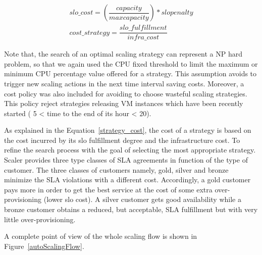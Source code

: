 \begin{equation}\label{strategy_cost}
\begin{split}
slo\_cost =  ( \dfrac{ capacity } {max capacity} ) * slo penalty \\
cost\_strategy = \dfrac{  slo\_fulfillment  } {infra\_cost}
\end{split}
\end{equation}


Note that, the search of an optimal scaling strategy can represent a NP hard problem, so that we again used the CPU fixed threshold to limit the maximum or minimum CPU percentage value offered for a strategy. This assumption avoids to trigger new scaling actions in the next time interval saving costs.  Moreover, a cost policy was also included for avoiding to choose wasteful scaling strategies. This policy reject strategies releasing VM instances which have been recently started ( 5 < time to the end of its hour < 20). 

As explained in the Equation~\ref{strategy_cost}, the cost of a strategy is based on the cost incurred by its slo fulfillment degree and the infrastructure cost. To refine the search process with the goal of selecting the most appropriate strategy. Scaler provides three type classes of SLA agreements in function of the type of customer. The three classes of customers namely, gold, silver and bronze minimize the SLA violations with a different cost. Accordingly, a gold customer pays more in order to get the best service at the cost of some extra over-provisioning (lower slo cost). A silver customer gets good availability while a bronze customer obtains a reduced,
but acceptable, SLA fulfillment but with very little over-provisioning.

A complete point of view of the whole scaling flow is shown in Figure~\ref{autoScalingFlow}.

